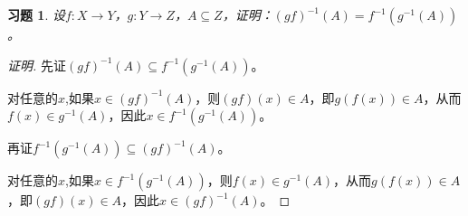 \documentclass{article}
\begin{document}
\begin{CJK}{UTF8}{gbsn}
\newtheorem*{Ex}{习题}
  \begin{Ex}
      设$f:X\to Y$，$g:Y\to Z$，$A\subseteq Z$，证明：$(gf)^{-1}(A)=f^{-1}(g^{-1}(A))$。 
  \end{Ex}
  \begin{proof}[证明]
    先证$(gf)^{-1}(A)\subseteq f^{-1}(g^{-1}(A))$。

    对任意的$x$,如果$x\in (gf)^{-1}(A)$，则$(gf)(x)\in A$，即$g(f(x))\in A$，从而$f(x)\in g^{-1}(A)$，因此$x\in f^{-1}(g^{-1}(A))$。
    

    再证$f^{-1}(g^{-1}(A))\subseteq (gf)^{-1}(A)$。

    对任意的$x$,如果$x\in f^{-1}(g^{-1}(A))$，则$f(x)\in g^{-1}(A)$，从而$g(f(x))\in A$，即$(gf)(x)\in A$，因此$x\in (gf)^{-1}(A)$。
  \end{proof}
\end{CJK}
\end{document}
